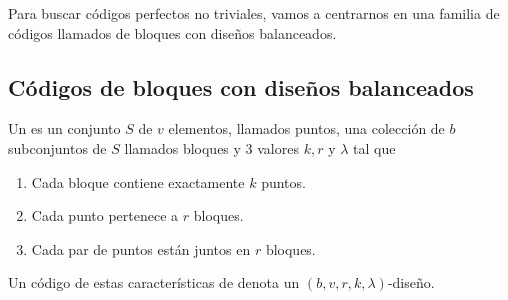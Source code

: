 Para buscar códigos perfectos no triviales, vamos a centrarnos en una familia de códigos llamados de bloques con diseños balanceados.

\subsection{Códigos de bloques con diseños balanceados}
\begin{definition}
Un  es un conjunto $S$ de $v$ elementos, llamados puntos, una colección de $b$ subconjuntos de $S$ llamados bloques y 3 valores $k, r$ y $\lambda$ tal que
	\begin{enumerate}
		\item Cada bloque contiene exactamente $k$ puntos.
		\item Cada punto pertenece a $r$ bloques.
		\item Cada par de puntos están juntos en $r$ bloques.
	\end{enumerate}
	Un código de estas características de denota un $(b, v, r, k, \lambda)$-diseño.
\end{definition}

